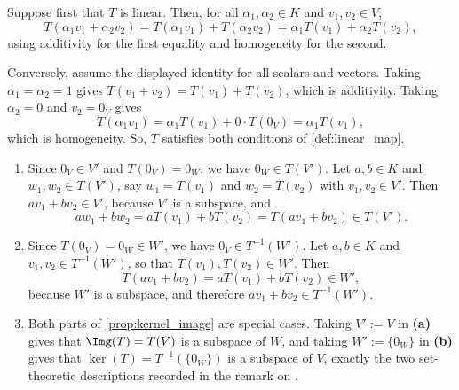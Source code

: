 \begin{exercisesolution}
\label{sol:linearity_criterion}
Suppose first that $T$ is linear. Then, for all $\alpha_1, \alpha_2 \in K$ and $v_1, v_2 \in V$,
\[
T(\alpha_1 v_1 + \alpha_2 v_2) = T(\alpha_1 v_1) + T(\alpha_2 v_2) = \alpha_1 T(v_1) + \alpha_2 T(v_2),
\]
using additivity for the first equality and homogeneity for the second.

Conversely, assume the displayed identity for all scalars and vectors. Taking $\alpha_1 = \alpha_2 = 1$ gives $T(v_1 + v_2) = T(v_1) + T(v_2)$, which is additivity. Taking $\alpha_2 = 0$ and $v_2 = 0_V$ gives
\[
T(\alpha_1 v_1) = \alpha_1 T(v_1) + 0 \cdot T(0_V) = \alpha_1 T(v_1),
\]
which is homogeneity. So, $T$ satisfies both conditions of \cref{def:linear_map}.
\end{exercisesolution}

\begin{exercisesolution}
\label{sol:images_preimages_subspaces}
\begin{enumerate}[label=\textbf{(\alph*)}]
    \item Since $0_V \in V'$ and $T(0_V) = 0_W$, we have $0_W \in T(V')$. Let $a, b \in K$ and $w_1, w_2 \in T(V')$, say $w_1 = T(v_1)$ and $w_2 = T(v_2)$ with $v_1, v_2 \in V'$. Then $a v_1 + b v_2 \in V'$, because $V'$ is a subspace, and
    \[
    a w_1 + b w_2 = a T(v_1) + b T(v_2) = T(a v_1 + b v_2) \in T(V').
    \]
    \item Since $T(0_V) = 0_W \in W'$, we have $0_V \in T^{-1}(W')$. Let $a, b \in K$ and $v_1, v_2 \in T^{-1}(W')$, so that $T(v_1), T(v_2) \in W'$. Then
    \[
    T(a v_1 + b v_2) = a T(v_1) + b T(v_2) \in W',
    \]
    because $W'$ is a subspace, and therefore $a v_1 + b v_2 \in T^{-1}(W')$.
    \item Both parts of \cref{prop:kernel_image} are special cases. Taking $V' := V$ in \textbf{(a)} gives that $\Img(T) = T(V)$ is a subspace of $W$, and taking $W' := \{0_W\}$ in \textbf{(b)} gives that $\ker(T) = T^{-1}(\{0_W\})$ is a subspace of $V$, exactly the two set-theoretic descriptions recorded in the remark on .
\end{enumerate}
\end{exercisesolution}

